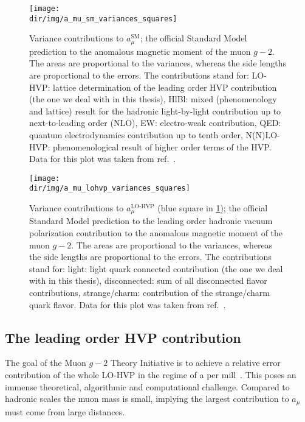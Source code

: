 \begin{figure}
\centering
\texttt{[image: \\dir/img/a\_mu\_sm\_variances\_squares]} %
\caption{
Variance contributions to $a_{\mu}^{\text{SM}}$; the official Standard Model prediction to the anomalous magnetic moment of the muon $g-2$.
The areas are proportional to the variances, whereas the side lengths are proportional to the errors.
The contributions stand for: LO-HVP: lattice determination of the leading order HVP contribution (the one we deal with in this thesis), HlBl: mixed (phenomenology and lattice) result for the hadronic light-by-light contribution up to next-to-leading order (NLO), EW: electro-weak contribution, QED: quantum electrodynamics contribution up to tenth order, N(N)LO-HVP: phenomenological result of higher order terms of the HVP.
Data for this plot was taken from ref.~\cite{snowmass:2025}.
}
\label{fig:a_mu:sm:variances}
\end{figure}

\begin{figure}
\centering
\texttt{[image: \\dir/img/a\_mu\_lohvp\_variances\_squares]}
\caption{
Variance contributions to $a_{\mu}^{\text{LO-HVP}}$ (blue square in \cref{fig:a_mu:sm:variances}); the official Standard Model prediction to the leading order hadronic vacuum polarization contribution to the anomalous magnetic moment of the muon $g-2$.
The areas are proportional to the variances, whereas the side lengths are proportional to the errors.
The contributions stand for: light: light quark connected contribution (the one we deal with in this thesis), disconnected: sum of all disconnected flavor contributions, strange/charm: contribution of the strange/charm quark flavor.
Data for this plot was taken from ref.~\cite{snowmass:2025}.
}
\label{fig:a_mu:lohvp:variances}
\end{figure}





\subsection{The leading order HVP contribution}
\label{sec:lohvp}

The goal of the Muon $g-2$ Theory Initiative is to achieve a relative error contribution of the whole LO-HVP in the regime of a per mill~\cite{online:gm2,snowmass:2025}.
This poses an immense theoretical, algorithmic and computational challenge.
Compared to hadronic scales the muon mass is small, implying the largest contribution to $a_{\mu}$ must come from large distances.

